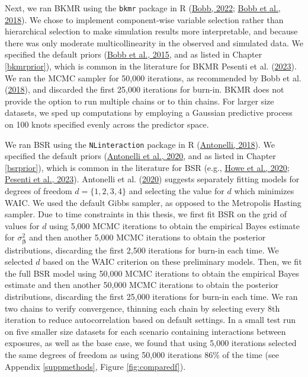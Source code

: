 \documentclass[12pt, twoside]{amherstthesis}
\begin{document}
Next, we ran BKMR using the \texttt{bkmr} package in R (\protect\hyperlink{ref-bobb_bkmr_2022}{Bobb, 2022}; \protect\hyperlink{ref-bobb_statistical_2018}{Bobb et al., 2018}). We chose to implement component-wise variable selection rather than hierarchical selection to make simulation results more interpretable, and because there was only moderate multicollinearity in the observed and simulated data. We specified the default priors (\protect\hyperlink{ref-bobb_bayesian_2015}{Bobb et al., 2015}, and as listed in Chapter \ref{bkmrprior}), which is common in the literature for BKMR Pesenti et al. (\protect\hyperlink{ref-pesenti_comparative_2023}{2023}). We ran the MCMC sampler for 50,000 iterations, as recommended by Bobb et al. (\protect\hyperlink{ref-bobb_statistical_2018}{2018}), and discarded the first 25,000 iterations for burn-in. BKMR does not provide the option to run multiple chains or to thin chains. For larger size datasets, we sped up computations by employing a Gaussian predictive process on 100 knots specified evenly across the predictor space.

We ran BSR using the \texttt{NLinteraction} package in R (\protect\hyperlink{ref-antonelli_nlinteraction_2018}{Antonelli, 2018}). We specified the default priors (\protect\hyperlink{ref-antonelli_estimating_2020}{Antonelli et al., 2020}, and as listed in Chapter \ref{bsrprior}), which is common in the literature for BSR (e.g., \protect\hyperlink{ref-howe_prenatal_2020}{Howe et al., 2020}; \protect\hyperlink{ref-pesenti_comparative_2023}{Pesenti et al., 2023}). Antonelli et al. (\protect\hyperlink{ref-antonelli_estimating_2020}{2020}) suggests separately fitting models for degrees of freedom \(d=\{1, 2, 3, 4\}\) and selecting the value for \(d\) which minimizes WAIC. We used the default Gibbs sampler, as opposed to the Metropolis Hasting sampler. Due to time constraints in this thesis, we first fit BSR on the grid of values for \(d\) using 5,000 MCMC iterations to obtain the empirical Bayes estimate for \(\sigma^2_{\boldsymbol\beta}\) and then another 5,000 MCMC iterations to obtain the posterior distributions, discarding the first 2,500 iterations for burn-in each time. We selected \(d\) based on the WAIC criterion on these preliminary models. Then, we fit the full BSR model using 50,000 MCMC iterations to obtain the empirical Bayes estimate and then another 50,000 MCMC iterations to obtain the posterior distributions, discarding the first 25,000 iterations for burn-in each time. We ran two chains to verify convergence, thinning each chain by selecting every 8th iteration to reduce autocorrelation based on default settings. In a small test run on five smaller size datasets for each scenario containing interactions between exposures, as well as the base case, we found that using 5,000 iterations selected the same degrees of freedom as using 50,000 iterations 86\% of the time (see Appendix \ref{suppmethods}, Figure \ref{fig:comparedf}).
\end{document}
